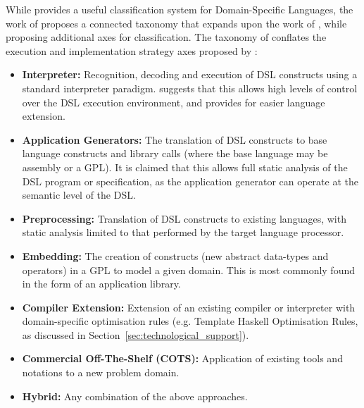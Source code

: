 While \citet{van2000domain} provides a useful classification system for Domain-Specific Languages, the work of \citet{Mernik:2005:DDL:1118890.1118892} proposes a connected taxonomy that expands upon the work of \citet{van2000domain}, while proposing additional axes for classification.
The taxonomy of \citet{Mernik:2005:DDL:1118890.1118892} conflates the execution and implementation strategy axes proposed by \citet{van2000domain}:
\begin{itemize}
    \item \textbf{Interpreter:} Recognition, decoding and execution of DSL constructs using a standard interpreter paradigm.
    \citet{Mernik:2005:DDL:1118890.1118892} suggests that this allows high levels of control over the DSL execution environment, and provides for easier language extension.
    \item \textbf{Application Generators:} The translation of DSL constructs to base language constructs and library calls (where the base language may be assembly or a GPL). 
    It is claimed that this allows full static analysis of the DSL program or specification, as the application generator can operate at the semantic level of the DSL.
    \item \textbf{Preprocessing:} Translation of DSL constructs to existing languages, with static analysis limited to that performed by the target language processor.
    \item \textbf{Embedding:} The creation of constructs (new abstract data-types and operators) in a GPL to model a given domain.
    This is most commonly found in the form of an application library. 
    \item \textbf{Compiler Extension:} Extension of an existing compiler or interpreter with domain-specific optimisation rules (e.g. Template Haskell Optimisation Rules, as discussed in Section~\ref{sec:technological_support}).
    \item \textbf{Commercial Off-The-Shelf (COTS):} Application of existing tools and notations to a new problem domain. 
    \item \textbf{Hybrid:} Any combination of the above approaches. 
\end{itemize}

